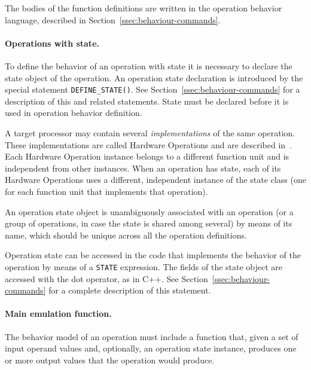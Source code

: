 \documentclass[twoside]{tceusermanual}
\begin{document}

The bodies of the function definitions are written in the operation behavior
language, described in Section~\ref{ssec:behaviour-commands}.

\paragraph{Operations with state.}

To define the behavior of an operation with state it is necessary to
declare the state object of the operation.  An operation state declaration
is introduced by the special statement \verb#DEFINE_STATE()#.  See
Section~\ref{ssec:behaviour-commands} for a description of this and related
statements. State must be declared before it is used in operation behavior
definition. 

A target processor may contain several \emph{implementations} of the
same operation.  These implementations are called Hardware Operations and
are described in~\cite{ADF-specs}.
%
Each Hardware Operation instance belongs to a different function unit and is
independent from other instances.
%
When an operation has state, each of its Hardware Operations uses a
different, independent instance of the state class (one for each function
unit that implements that operation).

An operation state object is unambiguously associated with an operation (or
a
group of operations, in case the state is shared among several) by means of
its name, which should be unique across all the operation definitions.%

Operation state can be accessed in the code that implements the behavior of
the operation by means of a \verb#STATE# expression.  The fields of the
state object are accessed with the dot operator, as in C++.  See
Section~\ref{ssec:behaviour-commands} for a complete description of this
statement.

\paragraph{Main emulation function.}
The behavior model of an operation must include a function that, given a
set of input operand values and, optionally, an operation state instance,
produces one or more output values that the operation would produce.
\end{document}
